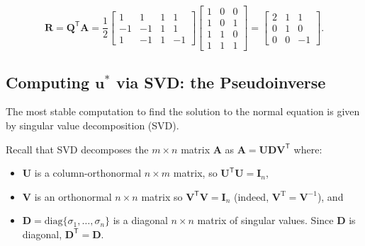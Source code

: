 \[ \mathbf{R}=\mathbf{Q}^\mathsf{T}\mathbf{A}
= \frac{1}{2}\left[\begin{array}{rrrr}1&1&1&1\\-1&-1&1&1\\1&-1&1&-1\end{array}\right]
\left[ \begin{array}{rrr}1&0&0\\1&0&1\\1&1&0\\1&1&1\end{array}\right] = 
\left[ \begin{array}{rrr}2&1&1\\ 0&1& 0\\ 0&0&-1\end{array}\right]. 
\] \sqend




\subsection{Computing $\mathbf u^*$ via SVD: the Pseudoinverse}

The most stable computation to find the solution to the normal equation is given by singular value decomposition (SVD).

Recall that SVD decomposes the $m \times n$ matrix $\mathbf  A$ as $\mathbf{A}= \mathbf{UDV}^\mathsf{T}$ where:

\begin{itemize}
\item $\mathbf{U}$ is a column-orthonormal $n\times m$ matrix, so $\mathbf{U}^\mathsf{T}\mathbf{U}=\mathbf{I}_n$,
\item $\mathbf{V}$ is an orthonormal $n\times n$ matrix so 
$\mathbf{V}^\mathsf{T}\mathbf{V}=\mathbf{I}_n$ (indeed, $\mathbf V ^ \mathrm T = \mathbf V ^ {-1} $), and 

\item $\mathbf{D}=\mathrm{diag}\{\sigma_1,\ldots,\sigma_n\}$ is a diagonal $n\times n$ matrix of singular values.  Since $\mathbf{D}$ is diagonal, $\mathbf{D}^\mathsf{T}=\mathbf{D}$.
\end{itemize}

